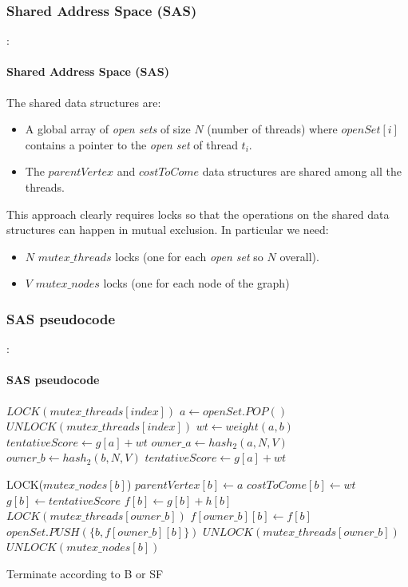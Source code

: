 \documentclass[12pt]{beamer}
\begin{document}
	\subsubsection{Shared Address Space (SAS)}
	\begin{frame}{\secname : \subsecname}
		\framesubtitle{Shared Address Space (SAS)}
		The shared data structures are:
		\begin{itemize}
			\item A global array of \textit{open sets} of size $N$ (number of threads)
				  where $openSet[i]$ contains a pointer to the \textit{open set} of thread $t_i$.
			\item The $parentVertex$ and $costToCome$ data structures are shared among all the threads.
		\end{itemize}
		This approach clearly requires locks so that the operations on the shared data structures
		can happen in mutual exclusion. In particular we need:
		\begin{itemize}
			\item $N$ $mutex\_threads$ locks (one for each \textit{open set} so $N$ overall).
			\item $V$ $mutex\_nodes$ locks (one for each node of the graph)
		\end{itemize}
	\end{frame}
	\subsubsection{SAS pseudocode}
	\begin{frame}[allowframebreaks]{\secname : \subsecname}
		\framesubtitle{SAS pseudocode}
		\begin{algorithmic}[1]
        				\State $LOCK(mutex\_threads[index])$\;
        				\State $a \gets openSet.POP()$\;
        				\State $UNLOCK(mutex\_threads[index])$\;
      				\EndWhile
        			\State $wt \gets weight(a, b)$\;
        			\State $tentativeScore \gets g[a] + wt$\;
          				\State $owner\_a \gets hash_2(a,N,V)$\;
          				\State $owner\_b \gets hash_2(b,N,V)$\;
					\EndIf
          			\State $tentativeScore \gets g[a] + wt$\;

          			\State LOCK($mutex\_nodes[b]$)\;
					    \State $parentVertex[b] \gets a$\;
            			\State $costToCome[b] \gets wt$\;
            			\State $g[b] \gets tentativeScore$\;
            			\State $f[b] \gets g[b] + h[b]$\;
            			\State $LOCK(mutex\_threads[owner\_b])$\;
            			\State $f[owner\_b][b] \gets f[b]$\;
            			\State $openSet.PUSH(\{b, f[owner\_b][b]\})$\;
            			\State $UNLOCK(mutex\_threads[owner\_b])$\;
          			\EndIf
          			\State $UNLOCK(mutex\_nodes[b])$\;
        		\EndFor
				\EndWhile

        		\State Terminate according to B or SF\;
      		\EndIf
		  \EndFunction
		  \end{algorithmic}
	\end{frame}
\end{document}

